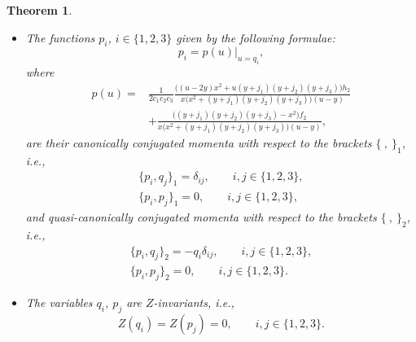 \documentclass[10pt,a4paper]{amsart}
\def\d{\delta}
\numberwithin{equation}{section}
\newtheorem{Theorem}{Theorem}[section]
\begin{document}
\begin{Theorem}
\begin{itemize}
\item[$(ii)$] The functions $p_i$, $i \in \{1,2,3\}$ given by the following formulae:
\begin{equation}\label{pi}
 p_i=p(u)|_{u=q_i},
 \end{equation}
 where
\begin{align}
p(u)= {}&
\frac{1}{2 c_1 c_2 c_3 }\frac{\big((u-2y) x^2+u(y+j_1)(y+j_2)(y+j_3)\big) h_2}{x\big(x^2+(y+j_1)(y+j_2)(y+j_3)\big)(u-y)}\nonumber\\
&+\frac{\big((y+j_1)(y+j_2)(y+j_3)-x^2\big) f_2}{x\big(x^2+(y+j_1)(y+j_2)(y+j_3)\big)(u-y)},\label{pu}
\end{align}
are their canonically conjugated momenta with respect to the brackets $\{ \ ,\ \}_1$, i.e.,
\begin{subequations} \label{qcanon1}
\begin{gather}
 \{p_i,q_j\}_1= \d_{ij}, \qquad i, j\in \{1,2,3\},
\\
\{p_i,p_j\}_1=0, \qquad i, j\in \{1,2,3\},
\end{gather}
\end{subequations}
and quasi-canonically conjugated momenta with respect to the brackets $\{ \ ,\ \}_2$, i.e.,
\begin{subequations}\label{qcanon2}
\begin{gather}
 \{p_i,q_j\}_2=-q_i \d_{ij}, \qquad i, j\in \{1,2,3\},
\\
\{p_i,p_j\}_2=0, \qquad i, j\in \{1,2,3\}.
\end{gather}
\end{subequations}
\item[$(iii)$] The variables $q_i$, $p_j$ are $Z$-invariants, i.e.,
\begin{equation}\label{qpinv}
Z(q_i)=Z(p_j)=0, \qquad i,j \in \{1,2,3\}.
\end{equation}
\end{itemize}
\end{Theorem}
\end{document}

